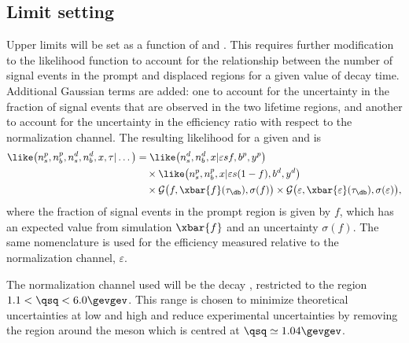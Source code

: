 \subsection{Limit setting}
Upper limits will be set as a function of \mass{\db} and \lifetime{\db}.
This requires further modification to the likelihood function to account for the relationship
between the number of signal events in the prompt and displaced regions for a given value of
decay time.
Additional Gaussian terms are added: one to account for the uncertainty in the fraction of
signal events that are observed in the two lifetime regions, and another to account for the
uncertainty in the efficiency ratio with respect to the normalization channel.
The resulting likelihood for a given \mass{\db} and \lifetime{\db} is
\begin{align}
  \like\big(n_s^p, n_b^p, n_s^d, n_b^d, x, \tau | \dots\big) &=
   \like\big(n_s^d, n_b^d, x | \varepsilon s f,b^p,y^p\big) \nonumber\\
   &\quad\times\like\big(n_s^p, n_b^p, x | \varepsilon s(1-f),b^d,y^d\big)\nonumber\\
   &\quad\times\mathcal{G}\big(f, \xbar{f}(\tau_\db),\sigma(f)\big)
   \times\mathcal{G}\big(\varepsilon, \xbar{\varepsilon}(\tau_\db),\sigma(\varepsilon)\big),
   \label{eq:db:lim}
\end{align}
where the fraction of signal events in the prompt region is given by $f$,
which has an expected value from simulation $\xbar{f}$ and an uncertainty $\sigma(f)$.
The same nomenclature is used for the efficiency measured relative to the normalization channel,
$\varepsilon$.

The normalization channel used will be the \sm decay \btokstrmumu, restricted to the region
$1.1<\qsq<6.0\gevgev$.
This range is chosen to minimize theoretical uncertainties at low and high \qsq and reduce
experimental uncertainties by removing the region around the \phii meson which is centred at
$\qsq\simeq1.04\gevgev$.



